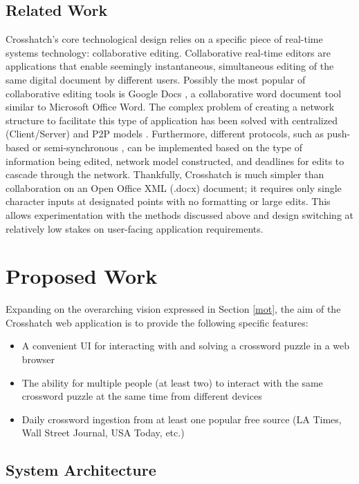 \documentclass{article}
\begin{document}
\subsection{Related Work}
Crosshatch's core technological design relies on a specific piece of real-time systems technology: collaborative editing.
Collaborative real-time editors are applications that enable seemingly instantaneous, simultaneous editing 
of the same digital document by different users.
Possibly the most popular of collaborative editing tools is Google Docs \cite{googledocs}, a collaborative
word document tool similar to Microsoft Office Word.
The complex problem of creating a network structure to facilitate this type of application has been solved with centralized (Client/Server)
and P2P models \cite{p2p} \cite{p2p2}.
Furthermore, different protocols, such as push-based \cite{pushbased} or semi-synchronous \cite{semisynchronous}, can be implemented based on the type of information being edited,
network model constructed, and deadlines for edits to cascade through the network.
Thankfully, Crosshatch is much simpler than collaboration on an Open Office XML (.docx) document; it requires only
single character inputs at designated points with no formatting or large edits.
This allows experimentation with the methods discussed above and design switching
at relatively low stakes on user-facing application requirements.

\section{Proposed Work}
Expanding on the overarching vision expressed in Section \ref{mot}, the aim of the Crosshatch web application is to provide the following
specific features:
\begin{itemize}
  \item A convenient UI for interacting with and solving a crossword puzzle in a web browser
  \item The ability for multiple people (at least two) to interact with the same crossword puzzle at the same time from different devices
  \item Daily crossword ingestion from at least one popular free source (LA Times, Wall Street Journal, USA Today, etc.)
\end{itemize}

\subsection{System Architecture}
\end{document}
